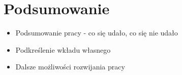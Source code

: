 \chapter{Podsumowanie}
\label{cha:rozdzial7}

\begin{itemize}
\item Podsumowanie pracy - co się udało, co się nie udało
\item Podkreślenie wkładu własnego
\item Dalsze możliwości rozwijania pracy
\end{itemize}